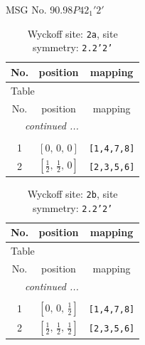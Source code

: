 \documentclass[fleqn,8pt]{jsarticle}
\begin{document}
\setcounter{MaxMatrixCols}{32}

\renewcommand{\tablename}{Table~}
\renewcommand{\figurename}{Figure~}
\begin{center}
\LARGE
MSG No. 90.98\quad$P42_{1}'2'$
\end{center}
\renewcommand{\arraystretch}{1.2}
\begin{longtable}{ccc}
\caption{Wyckoff site: {\tt 2a}, site symmetry: {\tt 2.2'2'}}
 \\
 \hline \hline
No. & position & mapping \\ \hline \endfirsthead

\multicolumn{2}{l}{\tablename\ \thetable{}} \\
 \hline \hline
No. & position & mapping \\ \hline \endhead

 \hline \hline
\multicolumn{2}{r}{\footnotesize\it continued ...} \\ \endfoot

 \hline \hline
\multicolumn{2}{r}{} \\ \endlastfoot

1 & $\left[ 0,\, 0,\, 0 \right]$ & {\tt [1,4,7,8]} \\ \hline
2 & $\left[ \frac{1}{2},\, \frac{1}{2},\, 0 \right]$ & {\tt [2,3,5,6]} \\
\end{longtable}
\renewcommand{\arraystretch}{1.2}
\begin{longtable}{ccc}
\caption{Wyckoff site: {\tt 2b}, site symmetry: {\tt 2.2'2'}}
 \\
 \hline \hline
No. & position & mapping \\ \hline \endfirsthead

\multicolumn{2}{l}{\tablename\ \thetable{}} \\
 \hline \hline
No. & position & mapping \\ \hline \endhead

 \hline \hline
\multicolumn{2}{r}{\footnotesize\it continued ...} \\ \endfoot

 \hline \hline
\multicolumn{2}{r}{} \\ \endlastfoot

1 & $\left[ 0,\, 0,\, \frac{1}{2} \right]$ & {\tt [1,4,7,8]} \\ \hline
2 & $\left[ \frac{1}{2},\, \frac{1}{2},\, \frac{1}{2} \right]$ & {\tt [2,3,5,6]} \\
\end{longtable}
\end{document}
